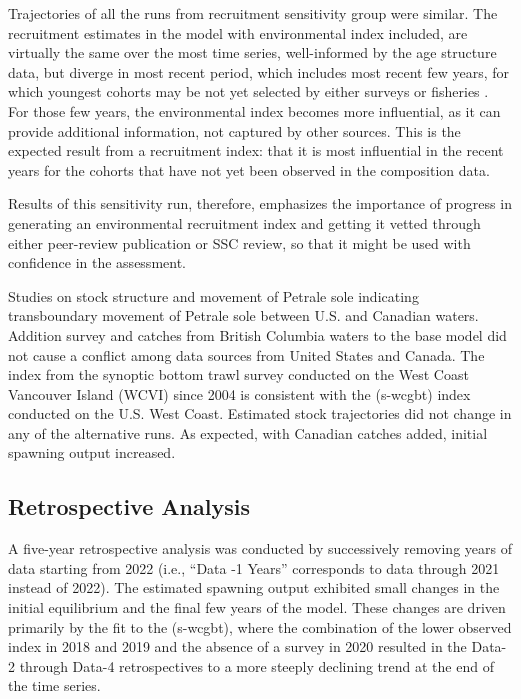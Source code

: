 \documentclass[
]{scrartcl}
\begin{document}
Trajectories of all the runs from recruitment sensitivity group were
similar. The recruitment estimates in the model with environmental index
included, are virtually the same over the most time series,
well-informed by the age structure data, but diverge in most recent
period, which includes most recent few years, for which youngest cohorts
may be not yet selected by either surveys or fisheries . For those few
years, the environmental index becomes more influential, as it can
provide additional information, not captured by other sources. This is
the expected result from a recruitment index: that it is most
influential in the recent years for the cohorts that have not yet been
observed in the composition data.

Results of this sensitivity run, therefore, emphasizes the importance of
progress in generating an environmental recruitment index and getting it
vetted through either peer-review publication or SSC review, so that it
might be used with confidence in the assessment.

Studies on stock structure and movement of Petrale sole indicating
transboundary movement of Petrale sole between U.S. and Canadian waters.
Addition survey and catches from British Columbia waters to the base
model did not cause a conflict among data sources from United States and
Canada. The index from the synoptic bottom trawl survey conducted on the
West Coast Vancouver Island (WCVI) since 2004 is consistent with the
(s-wcgbt) index conducted on the U.S. West Coast. Estimated stock
trajectories did not change in any of the alternative runs. As expected,
with Canadian catches added, initial spawning output increased.

\subsection{Retrospective Analysis}\label{retrospective-analysis}

A five-year retrospective analysis was conducted by successively
removing years of data starting from 2022 (i.e., ``Data -1 Years''
corresponds to data through 2021 instead of 2022). The estimated
spawning output exhibited small changes in the initial equilibrium and
the final few years of the model. These changes are driven primarily by
the fit to the (s-wcgbt), where the combination of the lower observed
index in 2018 and 2019 and the absence of a survey in 2020 resulted in
the Data-2 through Data-4 retrospectives to a more steeply declining
trend at the end of the time series.
\end{document}

